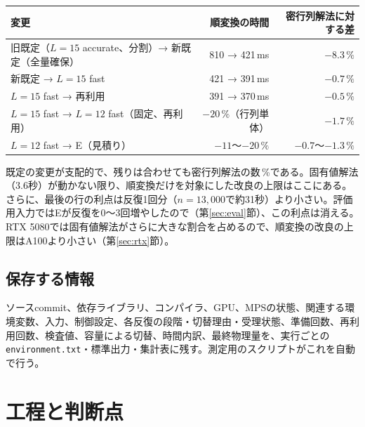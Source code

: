 \documentclass[a4paper,11pt]{ltjsarticle}
\newcommand{\code}[1]{\texttt{#1}}
\begin{document}
\noindent\begin{tabularx}{\linewidth}{@{}Yrr@{}}
\toprule
変更 & 順変換の時間 & 密行列解法に対する差\\
\midrule
旧既定（$L=15$ accurate、分割）→ 新既定（全量確保） & 810 → 421\,ms & $-8.3\,\%$\\
新既定 → $L=15$ fast & 421 → 391\,ms & $-0.7\,\%$\\
$L=15$ fast → 再利用 & 391 → 370\,ms & $-0.5\,\%$\\
$L=15$ fast → $L=12$ fast（固定、再利用） & $-20\,\%$（行列単体） & $-1.7\,\%$\\
$L=12$ fast → E（見積り） & $-11$〜$-20\,\%$ & $-0.7$〜$-1.3\,\%$\\
\bottomrule
\end{tabularx}

\medskip
既定の変更が支配的で、残りは合わせても密行列解法の数\,\%である。固有値解法（3.6秒）が動かない限り、順変換だけを対象にした改良の上限はここにある。さらに、最後の行の利点は反復1回分（$n=13{,}000$で約31秒）より小さい。評価用入力ではEが反復を0〜3回増やしたので（第\ref{sec:eval}節）、この利点は消える。RTX 5080では固有値解法がさらに大きな割合を占めるので、順変換の改良の上限はA100より小さい（第\ref{sec:rtx}節）。

\subsection{保存する情報}
ソースcommit、依存ライブラリ、コンパイラ、GPU、MPSの状態、関連する環境変数、入力、制御設定、各反復の段階・切替理由・受理状態、準備回数、再利用回数、検査値、容量による切替、時間内訳、最終物理量を、実行ごとの\code{environment.txt}・標準出力・集計表に残す。測定用のスクリプトがこれを自動で行う。

\section{工程と判断点}
\end{document}
